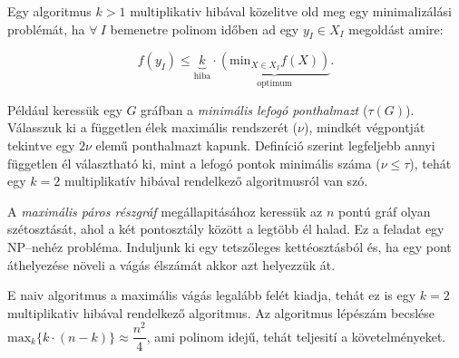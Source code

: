 Egy algoritmus $k>1$ multiplikativ hibával közelitve old meg egy minimalizálási
problémát, ha $\forall~I$ bemenetre polinom időben ad egy $y_I \in X_I$
megoldást amire:


\[
f(y_I) \leq \underbrace{k}_{\mbox{hiba}}  \cdot \underbrace{(\mbox{min}_{X \in X_I} f(X))}_{\mbox{optimum}}.
\]

Például keressük egy $G$ gráfban a \emph{minimális lefogó ponthalmazt} ($\tau(G)$).
Válasszuk ki a független élek maximális rendszerét ($\nu$), mindkét végpontját
tekintve egy $2\nu$ elemű ponthalmazt kapunk. Definíció szerint legfeljebb annyi
független él választható ki, mint a lefogó pontok minimális száma ($\nu \leq
\tau$), tehát egy $k=2$ multiplikatív hibával rendelkező algoritmusról van szó.

A \emph{maximális páros részgráf} megállapitásához keressük az $n$ pontú gráf olyan 
szétosztását, ahol a két pontosztály között a legtöbb él halad. Ez a feladat egy
NP--nehéz probléma. Induljunk ki egy tetszőleges kettéosztásból és, ha egy pont
áthelyezése növeli a vágás élszámát akkor azt helyezzük át.

E naiv algoritmus a maximális vágás legalább felét kiadja, tehát ez is egy $k=2$
multiplikativ hibával rendelkező algoritmus. Az algoritmus lépészám becslése
$\mbox{max}_k\{k\cdot(n-k)\}\approx \dfrac{n^2}{4}$, ami polinom idejű, tehát teljesití
a követelményeket.
